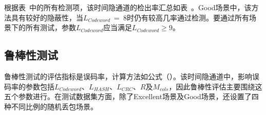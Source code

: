 
根据表\ 中的所有检测项，该时间隐通道的检出率汇总如表\ 。Good场景中，该方法具有较好的隐蔽性，当$L_{Codeword}\ =\ 8$时仍有较高几率通过检测。要通过所有场景下的所有测试，参数$L_{Codeword}$应当满足$L_{Codeword}\ge 9$。

\subsection{鲁棒性测试}
\label{chap:hash:result:robustness}

鲁棒性测试的评估指标是误码率，计算方法如公式（）。该时间隐通道中，影响误码率的参数包括$L_{Codeword}$、$L_{HASH}$、$L_{CRC}$、$R$及$M_{cols}$，因此鲁棒性评估主要围绕这五个参数进行。在测试数据集方面，除了Excellent场景及Good场景，还设置了四种不同比例的随机丢包场景。

